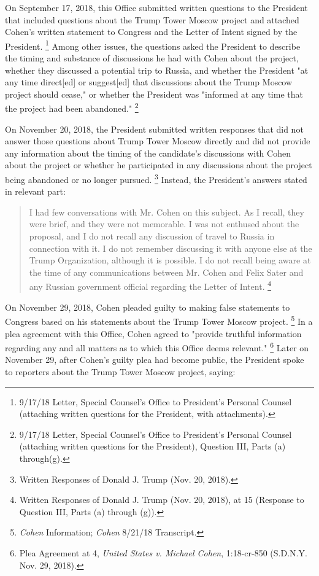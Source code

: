 {On September 17, 2018, this Office submitted written questions to the President that included questions about the Trump Tower Moscow project and attached Cohen's written statement to Congress and the Letter of Intent signed by the President.%
\footnote{9/17/18 Letter, Special Counsel’s Office to President’s Personal Counsel (attaching written questions for the President, with attachments).}
Among other issues, the questions asked the President to describe the timing and substance of discussions he had with Cohen about the project, whether they discussed a potential trip to Russia, and whether the President "at any time direct[ed] or suggest[ed] that discussions about the Trump Moscow project should cease," or whether the President was "informed at any time that the project had been abandoned."%
\footnote{9/17/18 Letter, Special Counsel’s Office to President’s Personal Counsel (attaching written questions for the President), Question III, Parts (a) through(g).}

On November 20, 2018, the President submitted written responses that did not answer those questions about Trump Tower Moscow directly and did not provide any information about the timing of the candidate's discussions with Cohen about the project or whether he participated in any discussions about the project being abandoned or no longer pursued.%
\footnote{Written Responses of Donald J. Trump (Nov. 20, 2018).}
Instead, the President's answers stated in relevant part:

\begin{quote}
I had few conversations with Mr. Cohen on this subject.
As I recall, they were brief, and they were not memorable.
I was not enthused about the proposal, and I do not recall any discussion of travel to Russia in connection with it.
I do not remember discussing it with anyone else at the Trump Organization, although it is possible.
I do not recall being aware at the time of any communications between Mr. Cohen and Felix Sater and any Russian government official regarding the Letter of Intent.%
\footnote{Written Responses of Donald J. Trump (Nov. 20, 2018), at 15 (Response to Question III, Parts (a) through (g)).}
\end{quote}

On November 29, 2018, Cohen pleaded guilty to making false statements to Congress based on his statements about the Trump Tower Moscow project.%
\footnote{\textit{Cohen} Information;
\textit{Cohen} 8/21/18 Transcript.}
In a plea agreement with this Office, Cohen agreed to "provide truthful information regarding any and all matters as to which this Office deems relevant."%
\footnote{Plea Agreement at 4, \textit{United States v. Michael Cohen}, 1:18-cr-850 (S.D.N.Y. Nov. 29, 2018).}
Later on November 29, after Cohen's guilty plea had become public, the President spoke to reporters about the Trump Tower Moscow project, saying:

}
